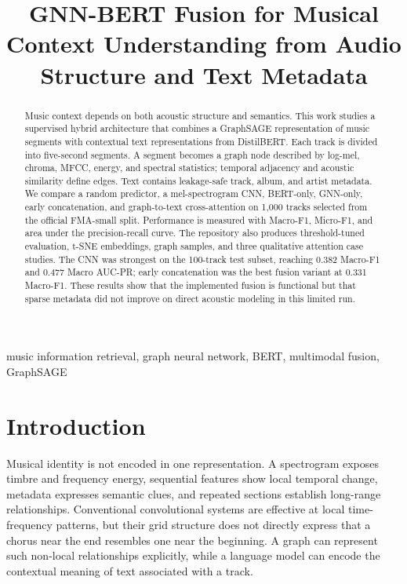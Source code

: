 \IfFileExists{IEEEtran.cls}{\usingieeetrue\documentclass[conference]{IEEEtran}}{\usingieeefalse\documentclass[10pt,twocolumn]{article}}
\title{GNN-BERT Fusion for Musical Context Understanding from Audio Structure and Text Metadata}
\author{\IEEEauthorblockN{Maskat Ibne Wahid, Zannaty Aziza, Abdur Rahman Piash}
\IEEEauthorblockA{Department of Computer Science and Engineering\\
BRAC University, Dhaka, Bangladesh\\{}
Group 7, Section 4; IDs: 22299224, 24241316, 22201583}}
\begin{document}
\maketitle

\begin{abstract}
Music context depends on both acoustic structure and semantics. This work studies a supervised hybrid architecture that combines a GraphSAGE representation of music segments with contextual text representations from DistilBERT. Each track is divided into five-second segments. A segment becomes a graph node described by log-mel, chroma, MFCC, energy, and spectral statistics; temporal adjacency and acoustic similarity define edges. Text contains leakage-safe track, album, and artist metadata. We compare a random predictor, a mel-spectrogram CNN, BERT-only, GNN-only, early concatenation, and graph-to-text cross-attention on 1,000 tracks selected from the official FMA-small split. Performance is measured with Macro-F1, Micro-F1, and area under the precision-recall curve. The repository also produces threshold-tuned evaluation, t-SNE embeddings, graph samples, and three qualitative attention case studies. The CNN was strongest on the 100-track test subset, reaching 0.382 Macro-F1 and 0.477 Macro AUC-PR; early concatenation was the best fusion variant at 0.331 Macro-F1. These results show that the implemented fusion is functional but that sparse metadata did not improve on direct acoustic modeling in this limited run.
\end{abstract}

\begin{IEEEkeywords}
music information retrieval, graph neural network, BERT, multimodal fusion, GraphSAGE
\end{IEEEkeywords}

\section{Introduction}
Musical identity is not encoded in one representation. A spectrogram exposes timbre and frequency energy, sequential features show local temporal change, metadata expresses semantic clues, and repeated sections establish long-range relationships. Conventional convolutional systems are effective at local time-frequency patterns, but their grid structure does not directly express that a chorus near the end resembles one near the beginning. A graph can represent such non-local relationships explicitly, while a language model can encode the contextual meaning of text associated with a track.
\end{document}
